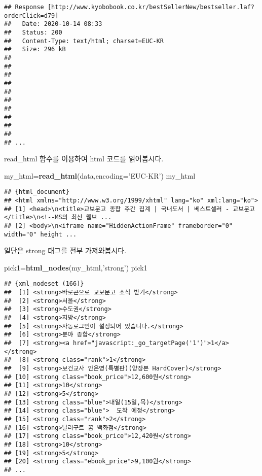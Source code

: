 \documentclass[
]{article}
\newenvironment{Shaded}{\begin{snugshade}}{\end{snugshade}}
\newcommand{\DataTypeTok}[1]{\textcolor[rgb]{0.13,0.29,0.53}{#1}}
\newcommand{\KeywordTok}[1]{\textcolor[rgb]{0.13,0.29,0.53}{\textbf{#1}}}
\newcommand{\NormalTok}[1]{#1}
\newcommand{\StringTok}[1]{\textcolor[rgb]{0.31,0.60,0.02}{#1}}
\begin{document}
\begin{verbatim}
## Response [http://www.kyobobook.co.kr/bestSellerNew/bestseller.laf?orderClick=d79]
##   Date: 2020-10-14 08:33
##   Status: 200
##   Content-Type: text/html; charset=EUC-KR
##   Size: 296 kB
## 
## 
## 
## 
## 
## 
## 
## 
## 
## 
## ...
\end{verbatim}

read\_html 함수를 이용하여 html 코드를 읽어봅시다.

\begin{Shaded}
\begin{Highlighting}[]
\NormalTok{my_html=}\KeywordTok{read_html}\NormalTok{(data,}\DataTypeTok{encoding=}\StringTok{'EUC-KR'}\NormalTok{)}
\NormalTok{my_html}
\end{Highlighting}
\end{Shaded}

\begin{verbatim}
## {html_document}
## <html xmlns="http://www.w3.org/1999/xhtml" lang="ko" xml:lang="ko">
## [1] <head>\n<title>교보문고 종합 주간 집계 | 국내도서 | 베스트셀러 - 교보문고</title>\n<!--MS의 최신 웹브 ...
## [2] <body>\n<iframe name="HiddenActionFrame" frameborder="0" width="0" height ...
\end{verbatim}

일단은 strong 태그를 전부 가져와봅시다.

\begin{Shaded}
\begin{Highlighting}[]
\NormalTok{pick1=}\KeywordTok{html_nodes}\NormalTok{(my_html,}\StringTok{'strong'}\NormalTok{)}
\NormalTok{pick1}
\end{Highlighting}
\end{Shaded}

\begin{verbatim}
## {xml_nodeset (166)}
##  [1] <strong>바로콘으로 교보문고 소식 받기</strong>
##  [2] <strong>서울</strong>
##  [3] <strong>수도권</strong>
##  [4] <strong>지방</strong>
##  [5] <strong>자동로그인이 설정되어 있습니다.</strong>
##  [6] <strong>분야 종합</strong>
##  [7] <strong><a href="javascript:_go_targetPage('1')">1</a></strong>
##  [8] <strong class="rank">1</strong>
##  [9] <strong>보건교사 안은영(특별판)(양장본 HardCover)</strong>
## [10] <strong class="book_price">12,600원</strong>
## [11] <strong>10</strong>
## [12] <strong>5</strong>
## [13] <strong class="blue">내일(15일,목)</strong>
## [14] <strong class="blue">  도착 예정</strong>
## [15] <strong class="rank">2</strong>
## [16] <strong>달러구트 꿈 백화점</strong>
## [17] <strong class="book_price">12,420원</strong>
## [18] <strong>10</strong>
## [19] <strong>5</strong>
## [20] <strong class="ebook_price">9,100원</strong>
## ...
\end{verbatim}
\end{document}
